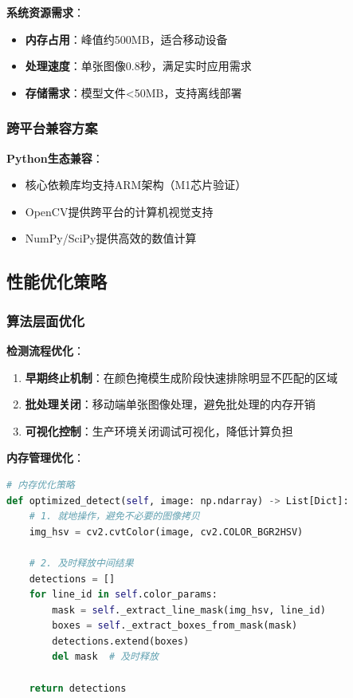 \documentclass[12pt,a4paper]{article}
\begin{document}
\textbf{系统资源需求}：
\begin{itemize}
    \item \textbf{内存占用}：峰值约500MB，适合移动设备
    \item \textbf{处理速度}：单张图像0.8秒，满足实时应用需求
    \item \textbf{存储需求}：模型文件<50MB，支持离线部署
\end{itemize}

\subsubsection{跨平台兼容方案}

\textbf{Python生态兼容}：
\begin{itemize}
    \item 核心依赖库均支持ARM架构（M1芯片验证）
    \item OpenCV提供跨平台的计算机视觉支持
    \item NumPy/SciPy提供高效的数值计算
\end{itemize}

\subsection{性能优化策略}

\subsubsection{算法层面优化}

\textbf{检测流程优化}：
\begin{enumerate}
    \item \textbf{早期终止机制}：在颜色掩模生成阶段快速排除明显不匹配的区域
    \item \textbf{批处理关闭}：移动端单张图像处理，避免批处理的内存开销
    \item \textbf{可视化控制}：生产环境关闭调试可视化，降低计算负担
\end{enumerate}

\textbf{内存管理优化}：
\begin{lstlisting}[language=Python]
# 内存优化策略
def optimized_detect(self, image: np.ndarray) -> List[Dict]:
    # 1. 就地操作，避免不必要的图像拷贝
    img_hsv = cv2.cvtColor(image, cv2.COLOR_BGR2HSV)
    
    # 2. 及时释放中间结果
    detections = []
    for line_id in self.color_params:
        mask = self._extract_line_mask(img_hsv, line_id)
        boxes = self._extract_boxes_from_mask(mask)
        detections.extend(boxes)
        del mask  # 及时释放
    
    return detections
\end{lstlisting}
\end{document}
